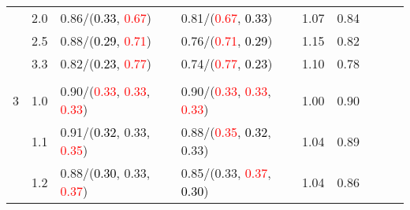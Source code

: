 \documentclass[10pt,a4paper]{report}
\begin{document}
\begin{table}[!htbp]
\begin{center}
{\begin{tabular}{ccllccccc}
				  & 2.0                               & 0.86/(\textcolor{black}{0.33}, \textcolor{red}{0.67})                                                                                           & 0.81/(\textcolor{red}{0.67}, \textcolor{black}{0.33})                                                                                           & 1.07             & 0.84                     \\
				  & 2.5                               & 0.88/(\textcolor{black}{0.29}, \textcolor{red}{0.71})                                                                                           & 0.76/(\textcolor{red}{0.71}, \textcolor{black}{0.29})                                                                                           & 1.15             & 0.82                     \\
				  & 3.3                               & 0.82/(\textcolor{black}{0.23}, \textcolor{red}{0.77})                                                                                           & 0.74/(\textcolor{red}{0.77}, \textcolor{black}{0.23})                                                                                           & 1.10             & 0.78                     \\
				  &                                   &                                                                                                                                                 &                                                                                                                                                 &                                             \\
				3 & 1.0                               & 0.90/(\textcolor{red}{0.33}, \textcolor{red}{0.33}, \textcolor{red}{0.33})                                                                      & 0.90/(\textcolor{red}{0.33}, \textcolor{red}{0.33}, \textcolor{red}{0.33})                                                                      & 1.00             & 0.90                     \\
				  & 1.1                               & 0.91/(\textcolor{black}{0.32}, 0.33, \textcolor{red}{0.35})                                                                                     & 0.88/(\textcolor{red}{0.35}, \textcolor{black}{0.32}, 0.33)                                                                                     & 1.04             & 0.89                     \\
				  & 1.2                               & 0.88/(\textcolor{black}{0.30}, 0.33, \textcolor{red}{0.37})                                                                                     & 0.85/(0.33, \textcolor{red}{0.37}, \textcolor{black}{0.30})                                                                                     & 1.04             & 0.86                     \\

\end{tabular}}
\end{center}
\end{table}
\end{document}
